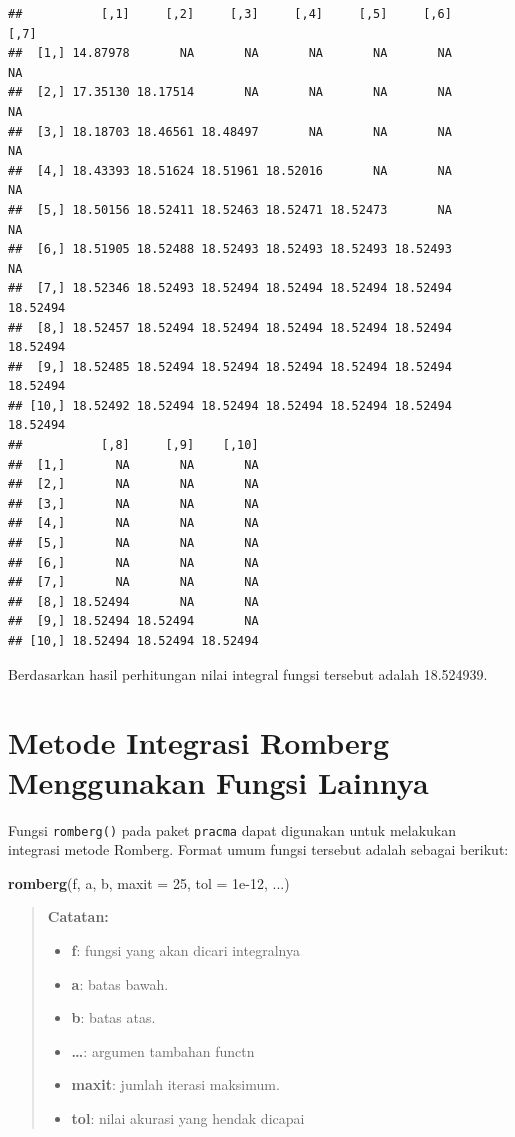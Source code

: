 \documentclass[]{book}
\newenvironment{Shaded}{\begin{snugshade}}{\end{snugshade}}
\newcommand{\DataTypeTok}[1]{\textcolor[rgb]{0.13,0.29,0.53}{#1}}
\newcommand{\DecValTok}[1]{\textcolor[rgb]{0.00,0.00,0.81}{#1}}
\newcommand{\FloatTok}[1]{\textcolor[rgb]{0.00,0.00,0.81}{#1}}
\newcommand{\KeywordTok}[1]{\textcolor[rgb]{0.13,0.29,0.53}{\textbf{#1}}}
\newcommand{\NormalTok}[1]{#1}
\providecommand{\tightlist}{%
  \setlength{\itemsep}{0pt}\setlength{\parskip}{0pt}}
\theoremstyle{definition}
\theoremstyle{definition}
\theoremstyle{definition}
\theoremstyle{remark}
\begin{document}
\begin{verbatim}
##           [,1]     [,2]     [,3]     [,4]     [,5]     [,6]     [,7]
##  [1,] 14.87978       NA       NA       NA       NA       NA       NA
##  [2,] 17.35130 18.17514       NA       NA       NA       NA       NA
##  [3,] 18.18703 18.46561 18.48497       NA       NA       NA       NA
##  [4,] 18.43393 18.51624 18.51961 18.52016       NA       NA       NA
##  [5,] 18.50156 18.52411 18.52463 18.52471 18.52473       NA       NA
##  [6,] 18.51905 18.52488 18.52493 18.52493 18.52493 18.52493       NA
##  [7,] 18.52346 18.52493 18.52494 18.52494 18.52494 18.52494 18.52494
##  [8,] 18.52457 18.52494 18.52494 18.52494 18.52494 18.52494 18.52494
##  [9,] 18.52485 18.52494 18.52494 18.52494 18.52494 18.52494 18.52494
## [10,] 18.52492 18.52494 18.52494 18.52494 18.52494 18.52494 18.52494
##           [,8]     [,9]    [,10]
##  [1,]       NA       NA       NA
##  [2,]       NA       NA       NA
##  [3,]       NA       NA       NA
##  [4,]       NA       NA       NA
##  [5,]       NA       NA       NA
##  [6,]       NA       NA       NA
##  [7,]       NA       NA       NA
##  [8,] 18.52494       NA       NA
##  [9,] 18.52494 18.52494       NA
## [10,] 18.52494 18.52494 18.52494
\end{verbatim}

Berdasarkan hasil perhitungan nilai integral fungsi tersebut adalah 18.524939.

\hypertarget{metode-integrasi-romberg-menggunakan-fungsi-lainnya}{%
\section{Metode Integrasi Romberg Menggunakan Fungsi Lainnya}\label{metode-integrasi-romberg-menggunakan-fungsi-lainnya}}

Fungsi \texttt{romberg()} pada paket \texttt{pracma} dapat digunakan untuk melakukan integrasi metode Romberg. Format umum fungsi tersebut adalah sebagai berikut:

\begin{Shaded}
\begin{Highlighting}[]
\KeywordTok{romberg}\NormalTok{(f, a, b, }\DataTypeTok{maxit =} \DecValTok{25}\NormalTok{, }\DataTypeTok{tol =} \FloatTok{1e-12}\NormalTok{, ...)}
\end{Highlighting}
\end{Shaded}

\begin{quote}
\textbf{Catatan:}

\begin{itemize}
\tightlist
\item
  \textbf{f}: fungsi yang akan dicari integralnya
\item
  \textbf{a}: batas bawah.
\item
  \textbf{b}: batas atas.
\item
  \textbf{\ldots{}}: argumen tambahan functn
\item
  \textbf{maxit}: jumlah iterasi maksimum.
\item
  \textbf{tol}: nilai akurasi yang hendak dicapai
\end{itemize}
\end{quote}
\end{document}
